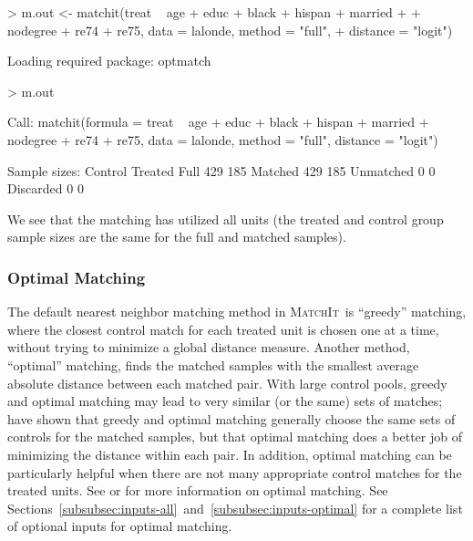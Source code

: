 \documentclass[oneside,letterpaper,titlepage]{article}
\newcommand{\MatchIt}{\textsc{MatchIt}}
\begin{document}
\begin{Schunk}
\begin{Sinput}
> m.out <- matchit(treat ~ age + educ + black + hispan + married + 
+     nodegree + re74 + re75, data = lalonde, method = "full", 
+     distance = "logit")
\end{Sinput}
\begin{Soutput}
Loading required package: optmatch
\end{Soutput}
\begin{Sinput}
> m.out
\end{Sinput}
\begin{Soutput}
Call: 
matchit(formula = treat ~ age + educ + black + hispan + married + 
    nodegree + re74 + re75, data = lalonde, method = "full", 
    distance = "logit")



Sample sizes:
          Control Treated
Full          429     185
Matched       429     185
Unmatched       0       0
Discarded       0       0
\end{Soutput}
\end{Schunk}

We see that the matching has utilized all units (the treated and
control group sample sizes are the same for the full and matched
samples). 

\subsubsection{Optimal Matching}
\label{subsubsec:optimal}

The default nearest neighbor matching method in \MatchIt\ is
``greedy'' matching, where the closest control match for each treated
unit is chosen one at a time, without trying to minimize a global
distance measure.  Another method, ``optimal'' matching, finds the
matched samples with the smallest average absolute distance between
each matched pair.  With large control pools, greedy and optimal
matching may lead to very similar (or the same) sets of matches;
\citet{GuRos93} have shown that greedy and optimal matching generally
choose the same sets of controls for the matched samples, but that
optimal matching does a better job of minimizing the distance within
each pair.  In addition, optimal matching can be particularly helpful
when there are not many appropriate control matches for the treated
units.  See \cite{GuRos93} or \cite{Rosenbaum02} for more information
on optimal matching. See
Sections~\ref{subsubsec:inputs-all}~and~\ref{subsubsec:inputs-optimal}
for a complete list of optional inputs for optimal matching.
\end{document}
